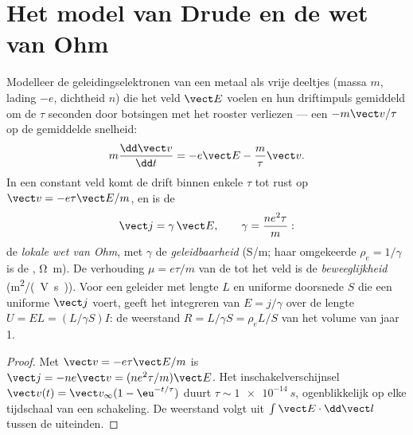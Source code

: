 \section{Het model van Drude en de wet van Ohm}

\begin{proposition}\label{prop:b2:charges-currents-conduction:drude}
Modelleer de geleidingselektronen van een metaal als vrije deeltjes (massa
$m$, lading $-e$, dichtheid $n$) die het veld $\vect E$ voelen en hun
driftimpuls gemiddeld om de $\tau$ seconden door botsingen met het rooster
verliezen --- een  $-m\vect v/\tau$ op de gemiddelde
snelheid:
\[
m\frac{\dd\vect v}{\dd t} = -e\vect E - \frac m\tau\vect v .
\]
In een constant veld komt de drift binnen enkele $\tau$ tot rust op
$\vect v = -e\tau
\vect E/m$, en is de 
\[
\vect j = \gamma\,\vect E , \qquad \gamma = \frac{ne^2\tau}{m} :
\]
de \emph{lokale wet van Ohm}, met $\gamma$ de \emph{geleidbaarheid}
(\unit{S/m}; haar omgekeerde $\rho_e = 1/\gamma$ is de \emph{}, \unit{\ohm.m}). De verhouding $\mu = e\tau/m$ van de
 tot het veld is de \emph{beweeglijkheid} (\unit{m^2/(V.s)}).
Voor een geleider met lengte $L$ en uniforme doorsnede $S$ die een uniforme
$\vect j$ voert, geeft het integreren van $E = j/\gamma$ over de lengte
$U = EL = (L/\gamma S)I$: de weerstand $R = L/\gamma S
= \rho_eL/S$ van het
volume van jaar 1.
\end{proposition}

\begin{proof}
Met $\vect v = -e\tau\vect E/m$ is
$\vect j = -ne\vect v = (ne^2\tau/m)\vect E$. Het inschakelverschijnsel
$\vect v(t) = \vect v_\infty(1 - \eu^{-t/\tau})$ duurt
$\tau \sim
\qty{1e-14}{s}$, ogenblikkelijk op elke tijdschaal van een
schakeling. De weerstand volgt uit $\int\vect E\cdot\dd\vect l$ tussen de
uiteinden.
\end{proof}

